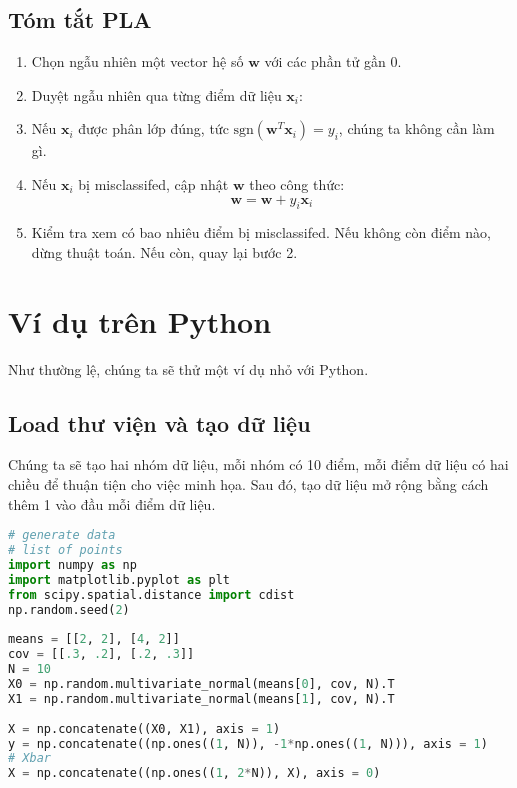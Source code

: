  
\subsection{Tóm tắt PLA }
\begin{enumerate}
\item Chọn ngẫu nhiên một vector hệ số $\mathbf{w}$ với các phần tử gần 0. 
\item Duyệt ngẫu nhiên qua từng điểm dữ liệu $\mathbf{x}_i$: 
    \item Nếu $\mathbf{x}_i$ được phân lớp đúng, tức $\text{sgn}(\mathbf{w}^T\mathbf{x}_i) = y_i$, chúng ta không cần làm gì. 
    \item Nếu $\mathbf{x}_i$ bị misclassifed, cập nhật $\mathbf{w}$ theo công thức: 
    \begin{equation} 
    \mathbf{w} = \mathbf{w} + y_i\mathbf{x}_i 
    \end{equation} 
\item Kiểm tra xem có bao nhiêu điểm bị misclassifed. Nếu không còn điểm nào, dừng thuật toán. Nếu còn, quay lại bước 2. 
\end{enumerate}
 
 
 
 
\section{Ví dụ trên Python}
Như thường lệ, chúng ta sẽ thử một ví dụ nhỏ với Python. 
 
 
\subsection{Load thư viện và tạo dữ liệu}
Chúng ta sẽ tạo hai nhóm dữ liệu, mỗi nhóm có 10 điểm, mỗi điểm dữ liệu có hai chiều để thuận tiện cho việc minh họa. Sau đó, tạo dữ liệu mở rộng bằng cách thêm 1 vào đầu mỗi điểm dữ liệu.  
 
 
\begin{lstlisting}[language=Python]
# generate data 
# list of points  
import numpy as np  
import matplotlib.pyplot as plt 
from scipy.spatial.distance import cdist 
np.random.seed(2) 
 
means = [[2, 2], [4, 2]] 
cov = [[.3, .2], [.2, .3]] 
N = 10 
X0 = np.random.multivariate_normal(means[0], cov, N).T 
X1 = np.random.multivariate_normal(means[1], cov, N).T 
 
X = np.concatenate((X0, X1), axis = 1) 
y = np.concatenate((np.ones((1, N)), -1*np.ones((1, N))), axis = 1) 
# Xbar  
X = np.concatenate((np.ones((1, 2*N)), X), axis = 0) 
\end{lstlisting}
 
